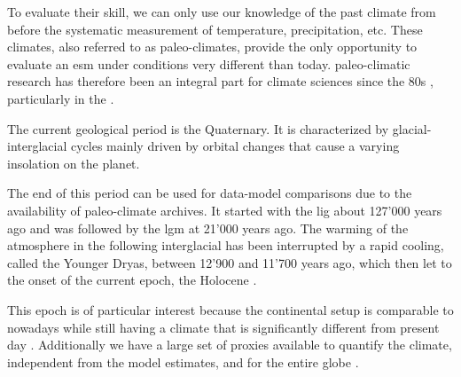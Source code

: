 \begin{refsection}
To evaluate their skill, we can only use our knowledge of the past climate from before the systematic measurement of temperature, precipitation, etc. These climates, also referred to as paleo-climates, provide the only opportunity to evaluate an \gls{esm} under conditions very different than today. paleo-climatic research has therefore been an integral part for climate sciences since the 80s \citep{COHMAPMembers1988, JoussaumeTaylor1995}, particularly in the  \citep{BraconnotOttoBliesnerHarrisonEtAl2007, BraconnotOttoBliesnerHarrisonEtAl2007a, BraconnotHarrisonKageyamaEtAl2012, KageyamaBraconnotHarrisonEtAl2016, Otto-BliesnerBraconnotHarrisonEtAl2017, JungclausBardBaroniEtAl2017}.

The current geological period is the Quaternary. It is characterized by glacial-interglacial cycles mainly driven by orbital changes \citep{HaysImbrieShackleton1976, ImbrieBergerBoyleEtAl1993} that cause a varying insolation on the planet.

The end of this period can be used for data-model comparisons due to the availability of paleo-climate archives. It started with the \gls{lig} about 127'000 years ago and was followed by the \gls{lgm} at 21'000 years ago. The warming of the atmosphere in the following interglacial  has been interrupted by a rapid cooling, called the Younger Dryas, between 12'900 and 11'700 years ago, which then let to the onset of the current epoch, the Holocene \citep{WalkerJohnsenRasmussenEtAl2009} .


This epoch is of particular interest because the continental setup is comparable to nowadays while still having a climate that is significantly different from present day . Additionally we have a large set of proxies available to quantify the climate, independent from the model estimates, and for the entire globe \citep{WannerBeerButikoferEtAl2008} .



\end{refsection}
